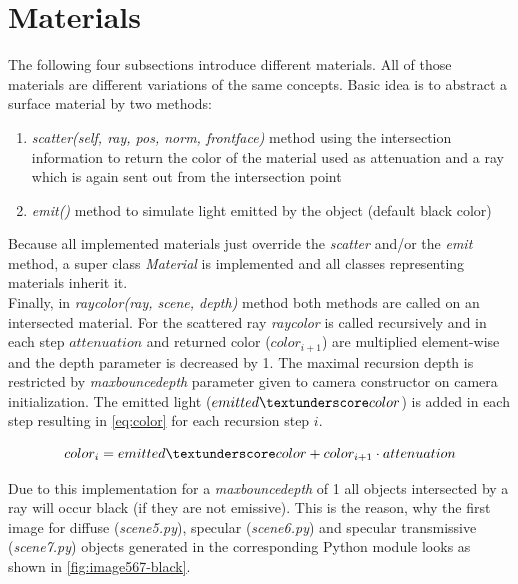 \documentclass[]{article}
\begin{document}
	\section{Materials}
		The following four subsections introduce different materials. All of those materials are different variations of the same concepts. Basic idea is to abstract a surface material by two methods:
		\begin{enumerate}
			\item{\emph{scatter(self, ray, pos, norm, front\textunderscore face)} method using the intersection information to return the color of the material used as attenuation and a ray which is again sent out from the intersection point}
			\item{\emph{emit()} method to simulate light emitted by the object (default black color)}
		\end{enumerate}
		Because all implemented materials just override the \emph{scatter} and/or the \emph{emit} method, a super class \emph{Material} is implemented and all classes representing materials inherit it.
		\\
		Finally, in \emph{ray\textunderscore color(ray, scene, depth)} method both methods are called on an intersected material. For the scattered ray \emph{ray\textunderscore color} is called recursively and in each step $attenuation$ and returned color ($color_{i+1}$) are multiplied element-wise and the depth parameter is decreased by 1. The maximal recursion depth is restricted by \emph{max\textunderscore bounce\textunderscore depth} parameter given to camera constructor on camera initialization. The emitted light ($emitted\textunderscore color$) is added in each step resulting in \cref{eq:color} for each recursion step $i$.
			
		\begin{equation}
			\label{eq:color}
			color_i = emitted\textunderscore color + color_{i+1}\cdot attenuation
		\end{equation}
		
		Due to this implementation for a \emph{max\textunderscore bounce\textunderscore depth} of 1 all objects intersected by a ray will occur black (if they are not emissive). This is the reason, why the first image for diffuse (\emph{scene5.py}), specular (\emph{scene6.py}) and specular transmissive (\emph{scene7.py}) objects generated in the corresponding Python module looks as shown in \cref{fig:image567-black}.
		
\end{document}
